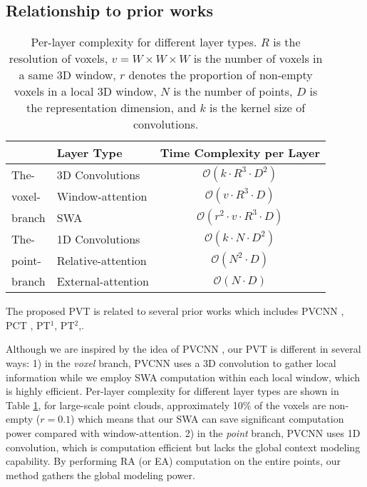 \documentclass[10pt,twocolumn,letterpaper]{article}
\begin{document}
\subsection{Relationship to prior works} \label{3.4} 
\begin{table}
\centering
\begin{center} 
    \begin{tabular}{|l|lc|}
    \hline
        & Layer Type      & Time Complexity per Layer  \\
    \hline
       The- & 3D Convolutions & $\mathcal{O}(k\cdot R^3\cdot D^2)$ \\
       voxel-  & Window-attention &     $\mathcal{O}(v\cdot R^3\cdot D)$ \\
       branch  & SWA &     $\mathcal{O}(r^2\cdot v\cdot R^3\cdot D)$ \\
       \hline
       The- & 1D Convolutions &  $\mathcal{O}(k\cdot N\cdot D^2)$ \\
       point- & Relative-attention &   $\mathcal{O}(N^2\cdot D)$ \\
       branch & External-attention &   $\mathcal{O}(N\cdot D)$ \\
  \hline
    \end{tabular}
    \end{center}
     \caption{Per-layer complexity for different layer types. $R$ is the resolution of voxels, $v = W\times W\times W$ is the number of voxels in a same 3D window, $r$ denotes the proportion of non-empty voxels in a local 3D window, $N$ is the number of points, $D$ is the representation dimension, and $k$ is the kernel size of convolutions.}
    \label{Complexity}
    
\end{table}

The proposed PVT is related to several prior works which includes PVCNN \cite{2019Point}, PCT \cite{guo2020pct}, PT$^1$\cite{Nico}, PT$^2$\cite{zhao2020point},.

Although we are inspired by the idea of PVCNN \cite{2019Point}, our PVT is different in several ways: 1) in the \emph{voxel} branch, PVCNN uses a 3D convolution to gather local information while we employ SWA computation within each local window, which is highly efficient. Per-layer complexity for different layer types are shown in Table \ref{Complexity}, for large-scale point clouds, approximately 10\% of the voxels are non-empty ($r=0.1$) \cite{xu2020grid} which means that our SWA can save significant computation power compared with window-attention.
2) in the \emph{point} branch, PVCNN uses 1D convolution, which is computation efficient but lacks the global context modeling capability. By performing RA (or EA) computation on the entire points, our method gathers the global modeling power.
\end{document}
